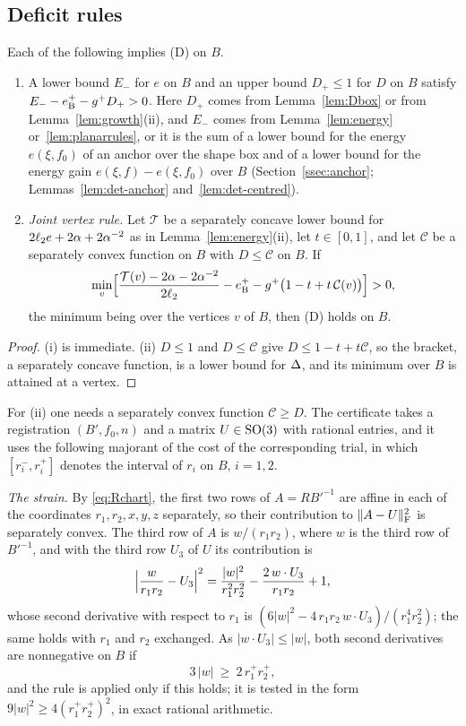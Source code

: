 \subsection{Deficit rules}\label{ssec:deficit}

\begin{lemma}\label{lem:deficit}
Each of the following implies \textup{(D)} on $B$.
\begin{enumerate}
\item[\textup{(i)}] A lower bound $E_-$ for $e$ on $B$ and an upper bound $D_+\le1$ for $D$ on $B$ satisfy
$E_--e_{\mathrm B}^+-g^+D_+>0$. Here $D_+$ comes from Lemma~\ref{lem:Dbox} or from Lemma~\ref{lem:growth}\textup{(ii)}, and $E_-$ comes
from Lemma~\ref{lem:energy} or~\ref{lem:planarrules}, or it is the sum of a lower bound for the energy $e(\xi,f_0)$ of an anchor over
the shape box and of a lower bound for the energy gain $e(\xi,f)-e(\xi,f_0)$ over $B$ (Section~\ref{ssec:anchor};
Lemmas~\ref{lem:det-anchor} and~\ref{lem:det-centred}).
\item[\textup{(ii)}] \emph{Joint vertex rule.} Let $\mathcal T$ be a separately concave lower bound for $2\ell_2 e+2\alpha+2\alpha^{-2}$
as in Lemma~\ref{lem:energy}\textup{(ii)}, let $t\in[0,1]$, and let $\mathcal C$ be a separately convex function on $B$ with
$D\le\mathcal C$ on $B$. If
\[
  \min_v\Bigl[\frac{\mathcal T(v)-2\alpha-2\alpha^{-2}}{2\ell_2}-e_{\mathrm B}^+-g^+\bigl(1-t+t\,\mathcal C(v)\bigr)\Bigr]>0 ,
\]
the minimum being over the vertices $v$ of $B$, then \textup{(D)} holds on $B$.
\end{enumerate}
\end{lemma}

\begin{proof}
(i) is immediate.
(ii) $D\le1$ and $D\le\mathcal C$ give $D\le1-t+t\mathcal C$, so the bracket, a separately concave function, is a lower bound for
$\Delta$, and its minimum over $B$ is attained at a vertex.
\end{proof}

For (ii) one needs a separately convex function $\mathcal C\ge D$. The certificate takes a registration $(B',f_0,n)$ and a matrix
$U\in\mathrm{SO}(3)$ with rational entries, and it uses the following majorant of the cost of the corresponding trial, in which
$[r_i^-,r_i^+]$ denotes the interval of $r_i$ on $B$, $i=1,2$.

\emph{The strain.} By \eqref{eq:Rchart}, the first two rows of $A=RB'^{-1}$ are affine in each of the coordinates $r_1,r_2,x,y,z$
separately, so their contribution to $\|A-U\|_\mathrm F^2$ is separately convex. The third row of $A$ is $w/(r_1r_2)$, where $w$ is the
third row of $B'^{-1}$, and with the third row $U_3$ of $U$ its contribution is
\[
  \Bigl|\frac w{r_1r_2}-U_3\Bigr|^2=\frac{|w|^2}{r_1^2r_2^2}-\frac{2\,w\cdot U_3}{r_1r_2}+1 ,
\]
whose second derivative with respect to $r_1$ is $(6|w|^2-4\,r_1r_2\,w\cdot U_3)/(r_1^4r_2^2)$; the same holds with $r_1$ and $r_2$
exchanged. As $|w\cdot U_3|\le|w|$, both second derivatives are nonnegative on $B$ if
\[
  3\,|w|\ \ge\ 2\,r_1^+r_2^+ ,
\]
and the rule is applied only if this holds; it is tested in the form $9|w|^2\ge4(r_1^+r_2^+)^2$, in exact rational arithmetic.

